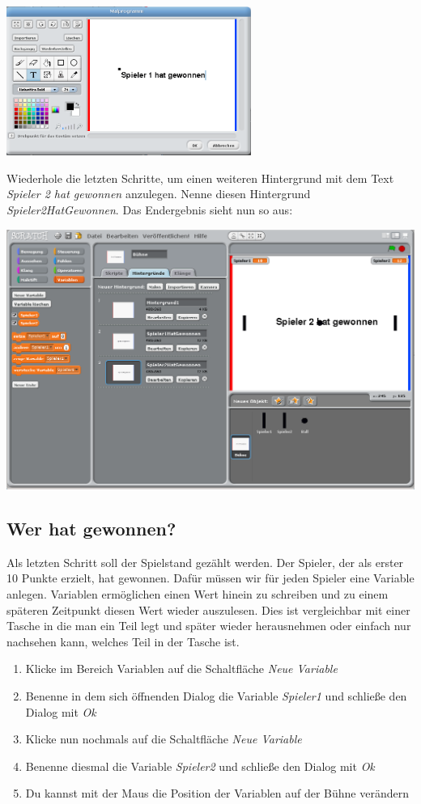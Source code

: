 \includegraphics[width=0.6\textwidth]{images/aufgabe5_pong_hintergrund_gewonnen_malen.png}

Wiederhole die letzten Schritte, um einen weiteren Hintergrund mit dem Text \textit{Spieler 2 hat gewonnen} anzulegen. Nenne diesen Hintergrund \textit{Spieler2HatGewonnen}. Das Endergebnis sieht nun so aus:

\includegraphics[width=1\textwidth]{images/aufgabe5_pong_hintergrund_2.png}



\subsection{Wer hat gewonnen?}
Als letzten Schritt soll der Spielstand gezählt werden. Der Spieler, der als erster 10 Punkte erzielt, hat gewonnen. 
Dafür müssen wir für jeden Spieler eine Variable anlegen. 
Variablen ermöglichen einen Wert hinein zu schreiben und zu einem späteren Zeitpunkt diesen Wert wieder auszulesen. Dies ist vergleichbar mit einer Tasche in die man ein Teil legt und später wieder herausnehmen oder einfach nur nachsehen kann, welches Teil in der Tasche ist. 

\begin{enumerate}
\item Klicke im Bereich Variablen auf die Schaltfläche \textit{Neue Variable}
\item Benenne in dem sich öffnenden Dialog die Variable \textit{Spieler1} und schließe den Dialog mit \textit{Ok}
\item Klicke nun nochmals auf die Schaltfläche \textit{Neue Variable}
\item Benenne diesmal die Variable \textit{Spieler2} und schließe den Dialog mit \textit{Ok}
\item Du kannst mit der Maus die Position der Variablen auf der Bühne verändern
\end{enumerate}

